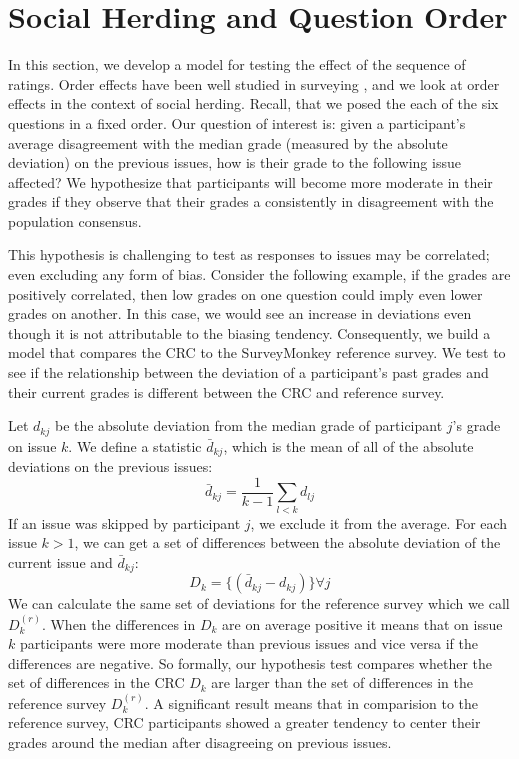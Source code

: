 \section{Social Herding and Question Order}
\label{path}
In this section, we develop a model for testing the effect of the sequence of ratings.
Order effects have been well studied in surveying \cite{krosnick1987evaluation}, and we look at order effects in the context of social herding. 
Recall, that we posed the each of the six questions in a fixed order.
Our question of interest is: given a participant's average disagreement with the median grade (measured by the absolute deviation) on the previous issues, how is their grade to the following issue affected?
We hypothesize that participants will become more moderate in their grades if they observe that their grades a consistently in disagreement with the population consensus.

This hypothesis is challenging to test as responses to issues may be correlated; even excluding any form of bias.
Consider the following example, if the grades are positively correlated, then low grades on one question could imply even lower grades on another.
In this case, we would see an increase in deviations even though it is not attributable to the biasing tendency.
Consequently, we build a model that compares the CRC to the SurveyMonkey reference survey.
We test to see if the relationship between the deviation of a participant's past grades and their current grades is different between the CRC and reference survey.

Let $d_{kj}$ be the absolute deviation from the median grade of participant $j$'s grade on issue $k$. 
We define a statistic $\bar{d}_{kj}$, which is the mean of all of the absolute deviations on the previous issues:
\begin{equation}
\bar{d}_{kj} = \frac{1}{k-1} \sum_{l < k}  d_{lj}
\end{equation}
If an issue was skipped by participant $j$, we exclude it from the average.
For each issue $k > 1$, we can get a set of differences between the absolute deviation of the current issue and $\bar{d}_{kj}$:
\begin{equation}
D_k = \{(\bar{d}_{kj}-d_{kj})\} \forall j
\end{equation}
We can calculate the same set of deviations for the reference survey which we call $D_k^{(r)}$.
When the differences in $D_k$ are on average positive it means that on issue $k$ participants were more moderate than previous issues and vice versa if the differences are negative.
So formally, our hypothesis test compares whether the set of differences in the CRC $D_k$ are larger than the set of differences in the reference survey $D_k^{(r)}$.
A significant result means that in comparision to the reference survey, CRC participants showed a greater tendency to center their grades around the median after disagreeing on previous issues.

